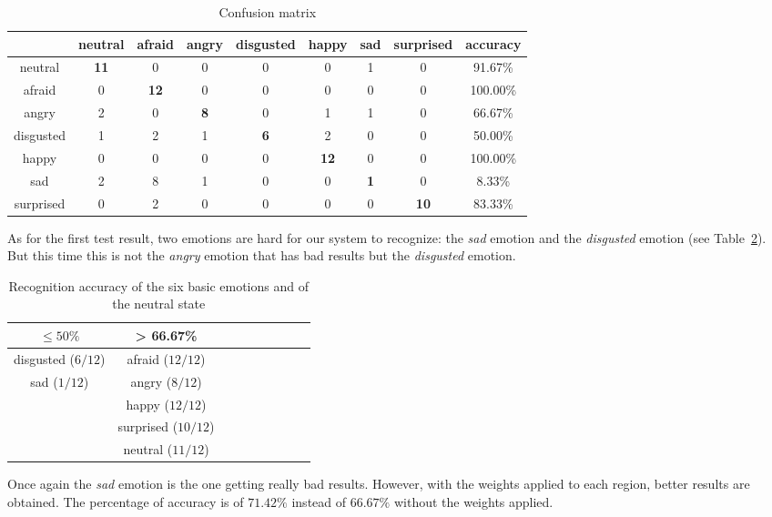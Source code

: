 \begin{table}[h]
\begin{center}
   \caption{\label{table_results_confusion_matrix_weight} Confusion matrix}
\begin{tabular}{|c|c|c|c|c|c|c|c|c|}
  \hline
   & neutral & afraid & angry & disgusted & happy & sad & surprised & accuracy \\
  \hline
  neutral & \textbf{11} & 0 & 0 & 0 & 0 & 1 & 0 & 91.67\% \\
  afraid & 0 & \textbf{12} & 0 & 0 & 0 & 0 & 0 & 100.00\% \\
  angry & 2 & 0 & \textbf{8} & 0 & 1 & 1 & 0 & 66.67\% \\
  disgusted & 1 & 2 & 1 & \textbf{6} & 2 & 0 & 0 & 50.00\% \\
  happy & 0 & 0 & 0 & 0 & \textbf{12} & 0 & 0 & 100.00\% \\
  sad & 2 & 8 & 1 & 0 & 0 & \textbf{1} & 0 & 8.33\% \\
  surprised & 0 & 2 & 0 & 0 & 0 & 0 & \textbf{10} & 83.33\%\\
  \hline
\end{tabular}
\end{center}
\end{table}

\noindent As for the first test result, two emotions are hard for our system to recognize: the \textit{sad} emotion and the \textit{disgusted} emotion (see Table~\ref{table_results_accuracy_weight}). But this time this is not the \textit{angry} emotion that has bad results but the \textit{disgusted} emotion.
\newline

\begin{table}[h]
\begin{center}
   \caption{\label{table_results_accuracy_weight} Recognition accuracy of the six basic emotions and of the neutral state}
\begin{tabular}{|c|c|c|c|c|c|c|c|c|}
  \hline
   $ \leq 50\% $ & > 66.67\% \\
  \hline
  disgusted ($ 6/12 $) & afraid ($ 12/12 $) \\
  sad ($ 1/12 $) & angry ($ 8/12 $) \\
   & happy ($ 12/12 $) \\
   & surprised ($ 10/12 $) \\
   & neutral ($ 11/12 $) \\
  \hline
\end{tabular}
\end{center} 
\end{table}

\noindent Once again the \textit{sad} emotion is the one getting really bad results. However, with the weights applied to each region, better results are obtained. The percentage of accuracy is of $71.42\%$ instead of $66.67\%$ without the weights applied.
\newline
